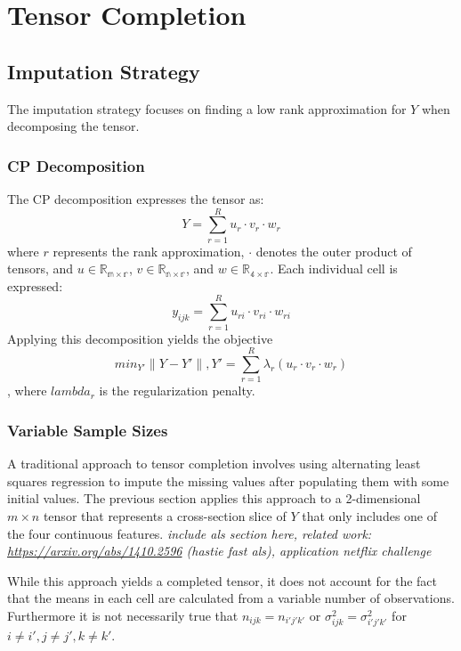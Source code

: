 \documentclass[12pt,twoside]{dukestatscithesis}
\theoremstyle{definition}
\theoremstyle{definition}
\theoremstyle{definition}
\theoremstyle{remark}
\begin{document}
\chapter{Tensor Completion}\label{tensor-completion}

\section{Imputation Strategy}\label{imputation-strategy}

The imputation strategy focuses on finding a low rank approximation for
\(Y\) when decomposing the tensor.

\subsection{CP Decomposition}\label{cp-decomposition}

The CP decomposition expresses the tensor as:
\[Y = \sum_{r=1}^Ru_r \cdotp v_r \cdotp w_r\] where \(r\) represents the
rank approximation, \(\cdotp\) denotes the outer product of tensors, and
\(u \in \mathbb{R_{m \times r}}\), \(v \in \mathbb{R_{n \times r}}\),
and \(w \in \mathbb{R_{4 \times r}}\). Each individual cell is
expressed: \[y_{ijk} = \sum_{r=1}^Ru_{ri} \cdotp v_{ri} \cdotp w_{ri}\]
Applying this decomposition yields the objective
\[min_{Y'}\|Y-Y'\|, Y' = \sum_{r=1}^R\lambda_r(u_r \cdotp v_r \cdotp w_r)\],
where \(lambda_r\) is the regularization penalty.

\subsection{Variable Sample Sizes}\label{variable-sample-sizes}

A traditional approach to tensor completion involves using alternating
least squares regression to impute the missing values after populating
them with some initial values. The previous section applies this
approach to a 2-dimensional \(m \times n\) tensor that represents a
cross-section slice of \(Y\) that only includes one of the four
continuous features. \emph{include als section here, related work:
\url{https://arxiv.org/abs/1410.2596} (hastie fast als), application
netflix challenge}

While this approach yields a completed tensor, it does not account for
the fact that the means in each cell are calculated from a variable
number of observations. Furthermore it is not necessarily true that
\(n_{ijk} = n_{i'j'k'}\) or \(\sigma^2_{ijk} = \sigma^2_{i'j'k'}\) for
\(i \neq i', j \neq j', k \neq k'\).
\end{document}
